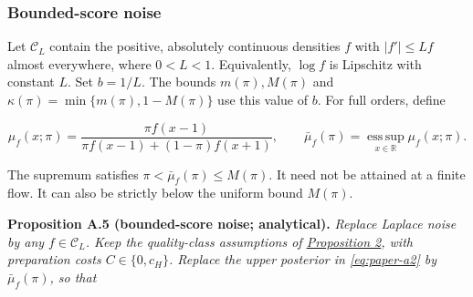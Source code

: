 
\subsubsection{Bounded-score noise}\label{logistic-noise}

Let \(\mathcal C_L\) contain the positive, absolutely continuous densities
\(f\) with \(|f'|\le Lf\) almost everywhere, where \(0<L<1\).
Equivalently, \(\log f\) is Lipschitz with constant \(L\).
Set \(b=1/L\).
The bounds \(m(\pi),M(\pi)\) and
\(\kappa(\pi)=\min\{m(\pi),1-M(\pi)\}\) use this value of \(b\).
For full orders, define

\[
\mu_f(x;\pi)=
\frac{\pi f(x-1)}{\pi f(x-1)+(1-\pi)f(x+1)},\qquad
\bar\mu_f(\pi)=\operatorname*{ess\,sup}_{x\in\mathbb R}\mu_f(x;\pi).
\]

The supremum satisfies \(\pi<\bar\mu_f(\pi)\le M(\pi)\).
It need not be attained at a finite flow.
It can also be strictly below the uniform bound \(M(\pi)\).


\protect{}\label{result-proposition-a-5}{\textbf{Proposition
A.5 (bounded-score noise; analytical).}} \emph{Replace Laplace noise by
any \(f\in\mathcal C_L\).
Keep the quality-class assumptions of
\hyperref[result-proposition-2]{Proposition 2}, with preparation costs
\(C\in\{0,c_H\}\).
Replace the upper posterior in \eqref{eq:paper-a2} by \(\bar\mu_f(\pi)\), so that}

